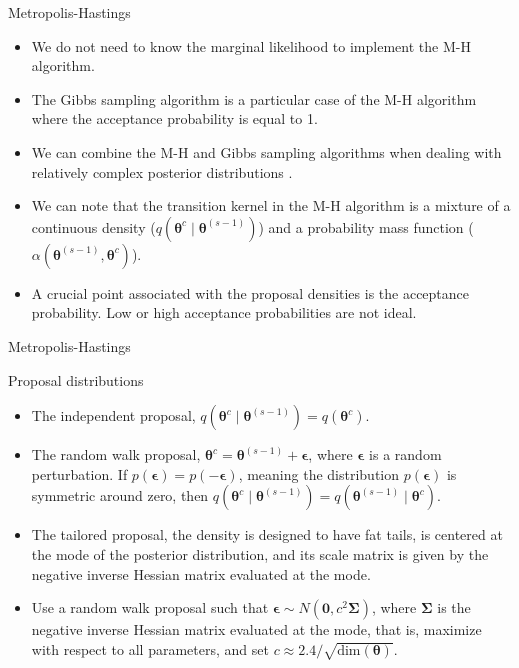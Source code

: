 \documentclass[12pt, compress]{beamer}
\begin{document}
\begin{frame}{Metropolis-Hastings}
\begin{itemize}
	\item We do not need to know the marginal likelihood to implement the M-H algorithm.
	\item The Gibbs sampling algorithm is a particular case of the M-H algorithm where the acceptance probability is equal to 1.
	\item We can combine the M-H and Gibbs sampling algorithms when dealing with relatively complex posterior distributions .
	\item We can note that the transition kernel in the M-H algorithm is a mixture of a continuous density ($q(\boldsymbol{\theta}^c \mid  \boldsymbol{\theta}^{(s-1)})$) and a probability mass function ($\alpha(\boldsymbol{\theta}^{(s-1)}, \boldsymbol{\theta}^c)$).
	\item A crucial point associated with the proposal densities is the acceptance probability. Low or high acceptance probabilities are not ideal. 
\end{itemize}
\end{frame}

\begin{frame}{Metropolis-Hastings}
	\begin{block}{Proposal distributions}
			\begin{itemize}
			\item The independent proposal, $q(\bm{\theta}^{c} \mid  \bm{\theta}^{(s-1)}) = q(\bm{\theta}^{c})$.
			\item The random walk proposal, $\bm{\theta}^{c} = \bm{\theta}^{(s-1)} + \bm{\epsilon}$, where $\bm{\epsilon}$ is a random perturbation. If $p(\boldsymbol{\epsilon}) = p(-\boldsymbol{\epsilon})$, meaning the distribution $p(\boldsymbol{\epsilon})$ is symmetric around zero, then $q(\boldsymbol{\theta}^c \mid \boldsymbol{\theta}^{(s-1)}) = q(\boldsymbol{\theta}^{(s-1)} \mid \boldsymbol{\theta}^c)$.
			\item The tailored proposal, the density is designed to have fat tails, is centered at the mode of the posterior distribution, and its scale matrix is given by the negative inverse Hessian matrix evaluated at the mode.
			\item Use a random walk proposal such that $\boldsymbol{\epsilon} \sim N(\boldsymbol{0}, c^2 \boldsymbol{\Sigma})$, where $\boldsymbol{\Sigma}$ is the negative inverse Hessian matrix evaluated at the mode, that is, maximize with respect to all parameters, and set $c \approx 2.4 / \sqrt{\text{dim}(\boldsymbol{\theta})}$. 
		\end{itemize}
	\end{block}
\end{frame}
\end{document}

